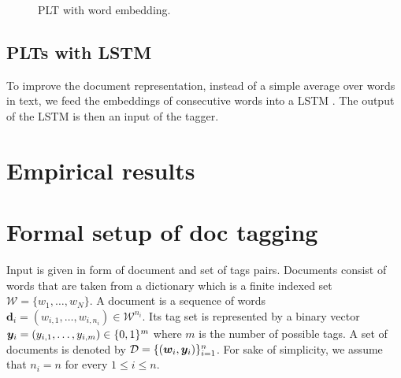 \documentclass{article}
\newcommand{\cD}{\mathcal{D}}
\newcommand{\bd}{\mathbf{d}}
\newcommand{\calW}{\mathcal{W}}
\newcommand{\sectionBefore}{-0pt}
\newcommand{\sectionAfter}{-0pt}
\begin{document}
\begin{figure}
	\begin{center}
		
	\end{center}
	\caption{PLT with word embedding.}
	\label{pic:model-embedding}
\end{figure}



\vspace{\sectionBefore}
\subsection{PLTs with LSTM}
\label{sec:sparse_input}
\vspace{\sectionAfter}

To improve the document representation, instead of a simple average over words in text, we feed the embeddings of consecutive words into a LSTM \cite{!}. The output of the LSTM is then an input of the tagger.

\vspace{\sectionBefore}
\section{Empirical results}
\label{sec:empirical_results}
\vspace{\sectionAfter}





\vspace{\sectionBefore}
\section{Formal setup of doc tagging}
\label{sec:formal}
\vspace{\sectionAfter}


Input is given in form of document and set of tags pairs. Documents consist of words that are taken from a dictionary which is a finite indexed set $\calW = \{ w_1, \dots , w_N \}$. A document is a sequence of words  $\bd_i = (w_{i,1}, \dots, w_{i,n_i})\in \calW^{n_i}$. Its tag set is represented  by a binary vector $\boldsymbol{y}_i = (y_{i,1}, \ldots, y_{i,m}) \in \{ 0 , 1 \}^m$ where $m$ is the number of possible tags. A set of documents is denoted by $\cD = \{ (\bw_i, \by_{i}) \}_{i=1}^n$. For sake of simplicity, we assume that $n_i = n$ for every $1\le i \le n$.
\end{document}
